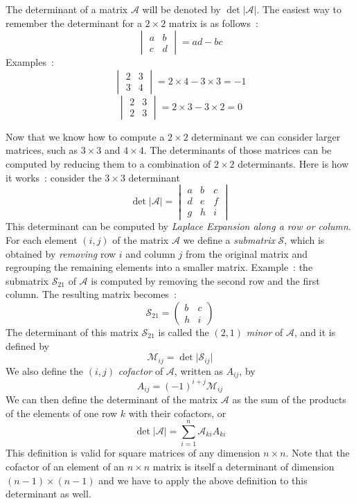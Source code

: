 The determinant of a matrix $\mathcal{A}$ will be denoted by $\det\vert\mathcal{A}\vert$.  The easiest way to
remember the determinant for a $2\times 2$ matrix is as follows~:  
\begin{equation}
\begin{vmatrix}a&b\\ c&d\end{vmatrix}=ad-bc
\end{equation}
Examples~:
\[
\begin{vmatrix}2&3\\ 3&4\end{vmatrix}=2\times 4-3\times 3=-1
\]
\[
\begin{vmatrix}2&3\\ 2&3\end{vmatrix}=2\times 3-3\times 2=0
\]

Now that we know how to compute a $2\times 2$ determinant we can consider larger matrices, such as $3\times 3$ and $4\times 4$.
The determinants of those matrices can be computed by reducing them to a combination of $2\times 2$ determinants.  Here is how it works~:
consider the $3\times 3$ determinant 
\[
\det\vert\mathcal{A}\vert=\begin{vmatrix}a&b&c\\ d&e&f\\ g&h&i\end{vmatrix}
\]
This determinant can be computed by \textit{Laplace Expansion along a row or column}.  
For each element $(i,j)$  of the matrix $\mathcal{A}$ we define a \textit{submatrix} $\mathcal{S}$, which is obtained 
by \textit{removing}  row $i$ and  column $j$ from the original matrix and regrouping the remaining elements into a smaller
matrix.  Example~: the submatrix $\mathcal{S}_{21}$ of $\mathcal{A}$ is computed by removing the second row and the first column.
The resulting matrix becomes~:
\[
\mathcal{S}_{21}=\begin{pmatrix}b&c\\ h&i\end{pmatrix}
\]
The determinant of this matrix $\mathcal{S}_{21}$ is called the $(2,1)$ \textit{minor} of $\mathcal{A}$, and it is defined by
\begin{equation}
\mathcal{M}_{ij}=\det\vert\mathcal{S}_{ij}\vert
\end{equation}
We also define the $(i,j)$ \textit{cofactor} of $\mathcal{A}$, written as $A_{ij}$, by
\begin{equation}
A_{ij}=(-1)^{i+j}\mathcal{M}_{ij}
\end{equation}
We can then define the determinant of the matrix $\mathcal{A}$ as the sum of the products of the elements of one row $k$ with their cofactors, or
\begin{equation}
\det\vert\mathcal{A}\vert=\sum_{i=1}^{n}\mathcal{A}_{ki}A_{ki}
\end{equation}
This definition is valid for square matrices of any dimension $n\times n$.  Note that the cofactor of an element of an $n\times n$ matrix is 
itself a determinant of dimension $(n-1)\times (n-1)$ and we have to apply the above definition to this determinant as well.  

